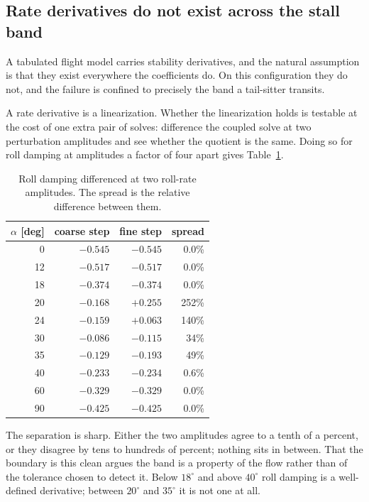 \documentclass[submit]{aiaa-tc}
\begin{document}
\subsection{Rate derivatives do not exist across the stall band}
\label{sec:ratelinearity}

A tabulated flight model carries stability derivatives, and the natural
assumption is that they exist everywhere the coefficients do. On this
configuration they do not, and the failure is confined to precisely the
band a tail-sitter transits.

A rate derivative is a linearization. Whether the linearization holds is
testable at the cost of one extra pair of solves: difference the coupled
solve at two perturbation amplitudes and see whether the quotient is the
same. Doing so for roll damping at amplitudes a factor of four apart
gives Table~\ref{tab:ratelinearity}.

\begin{table}[tb]
  \centering
  \caption{Roll damping differenced at two roll-rate amplitudes. The
    spread is the relative difference between them.}
  \label{tab:ratelinearity}
  \begin{tabular}{rrrr}
    \hline
    $\alpha$ [deg] & coarse step & fine step & spread \\
    \hline
    0  & $-0.545$ & $-0.545$ & 0.0\% \\
    12 & $-0.517$ & $-0.517$ & 0.0\% \\
    18 & $-0.374$ & $-0.374$ & 0.0\% \\
    20 & $-0.168$ & $+0.255$ & 252\% \\
    24 & $-0.159$ & $+0.063$ & 140\% \\
    30 & $-0.086$ & $-0.115$ & 34\% \\
    35 & $-0.129$ & $-0.193$ & 49\% \\
    40 & $-0.233$ & $-0.234$ & 0.6\% \\
    60 & $-0.329$ & $-0.329$ & 0.0\% \\
    90 & $-0.425$ & $-0.425$ & 0.0\% \\
    \hline
  \end{tabular}
\end{table}

The separation is sharp. Either the two amplitudes agree to a tenth of a
percent, or they disagree by tens to hundreds of percent; nothing sits in
between. That the boundary is this clean argues the band is a property of
the flow rather than of the tolerance chosen to detect it. Below
$18^\circ$ and above $40^\circ$ roll damping is a well-defined
derivative; between $20^\circ$ and $35^\circ$ it is not one at all.
\end{document}
